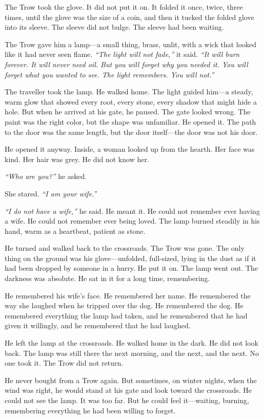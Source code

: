 The Trow took the glove. It did not put it on. It folded it once, twice, three times, until the glove was the size of a coin, and then it tucked the folded glove into its sleeve. The sleeve did not bulge. The sleeve had been waiting.

The Trow gave him a lamp—a small thing, brass, unlit, with a wick that looked like it had never seen flame. \textit{``The light will not fade,''} it said. \textit{``It will burn forever. It will never need oil. But you will forget why you needed it. You will forget what you wanted to see. The light remembers. You will not.''}

The traveller took the lamp. He walked home. The light guided him—a steady, warm glow that showed every root, every stone, every shadow that might hide a hole. But when he arrived at his gate, he paused. The gate looked wrong. The paint was the right color, but the shape was unfamiliar. He opened it. The path to the door was the same length, but the door itself—the door was not his door.

He opened it anyway. Inside, a woman looked up from the hearth. Her face was kind. Her hair was grey. He did not know her.

\textit{``Who are you?''} he asked.

She stared. \textit{``I am your wife.''}

\textit{``I do not have a wife,''} he said. He meant it. He could not remember ever having a wife. He could not remember ever being loved. The lamp burned steadily in his hand, warm as a heartbeat, patient as stone.

He turned and walked back to the crossroads. The Trow was gone. The only thing on the ground was his glove—unfolded, full-sized, lying in the dust as if it had been dropped by someone in a hurry. He put it on. The lamp went out. The darkness was absolute. He sat in it for a long time, remembering.

He remembered his wife's face. He remembered her name. He remembered the way she laughed when he tripped over the dog. He remembered the dog. He remembered everything the lamp had taken, and he remembered that he had given it willingly, and he remembered that he had laughed.

He left the lamp at the crossroads. He walked home in the dark. He did not look back. The lamp was still there the next morning, and the next, and the next. No one took it. The Trow did not return.

He never bought from a Trow again. But sometimes, on winter nights, when the wind was right, he would stand at his gate and look toward the crossroads. He could not see the lamp. It was too far. But he could feel it—waiting, burning, remembering everything he had been willing to forget.

